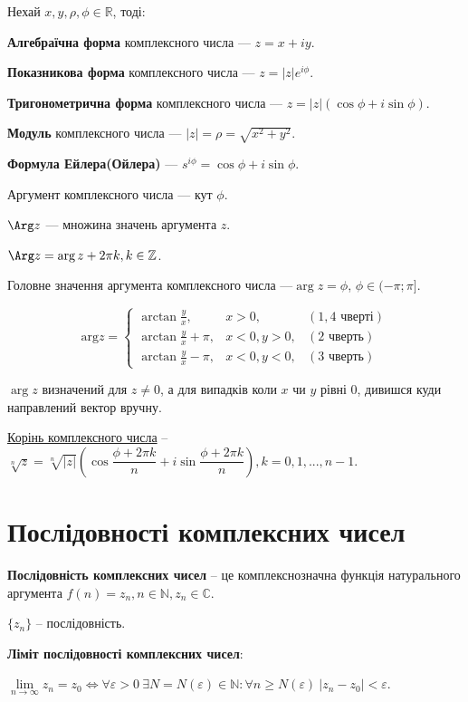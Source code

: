 Нехай $x, y, \rho, \phi \in \mathbb{R}$, тоді:

\textbf{Алгебраїчна форма} комплексного числа --- $z = x + iy$.

\textbf{Показникова форма} комплексного числа --- $z = |z|e^{i \phi}$.

\textbf{Тригонометрична форма} комплексного числа --- $z = |z| (\cos \phi + i \sin \phi)$.

\textbf{Модуль} комплексного числа --- $|z| = \rho = \sqrt{x^2 + y^2}$.

\textbf{Формула Ейлера(Ойлера)} --- $s^{i \phi} = \cos \phi + i \sin \phi$.

Аргумент комплексного числа --- кут $\phi$.

$\Arg z$ --- множина значень аргумента $z$.

$\Arg z =  \arg z + 2 \pi k, k \in \mathbb{Z}$.

Головне значення аргумента комплексного числа ---$\arg z =  \phi$, $\phi \in ( - \pi; \pi ]$.

$$\text{arg}z = \left\{ \begin{array}{lcr}
\arctan{\frac{y}{x}},       & x>0,      & (1, 4 \text{ чверті}) \\
\arctan{\frac{y}{x}} + \pi, & x<0, y>0, & (2 \text{ чверть}) \\
\arctan{\frac{y}{x}} - \pi, & x<0, y<0, & (3 \text{ чверть})
\end{array}\right. $$

$\arg z$ визначений для $z \neq 0$, а для випадків коли $x$ чи $y$ рівні 0, дивишся куди направлений вектор вручну.

\underline{Корінь комплексного числа} -- $\sqrt[n]{z} = \sqrt[n]{|z|}(\cos\dfrac{\phi+2\pi k}{n} + i\sin\dfrac{\phi+2\pi k}{n}), k=0,1,...,n-1$.



\section{Послідовності комплексних чисел}

\textbf{Послідовність комплексних чисел} -- це комплекснозначна функція натурального аргумента $f(n) = z_n, n\in\mathbb{N}, z_n\in\mathbb{C}$.

$\{z_n\}$ -- послідовність.

\textbf{Ліміт послідовності комплексних чисел}:

$\lim\limits_{n\rightarrow\infty} z_n = z_0 \Leftrightarrow \forall\varepsilon > 0 ~ \exists N = N ( \varepsilon ) \in\mathbb{N} : \forall n \geqslant N(\varepsilon) ~ |z_n-z_0|<\varepsilon$.

